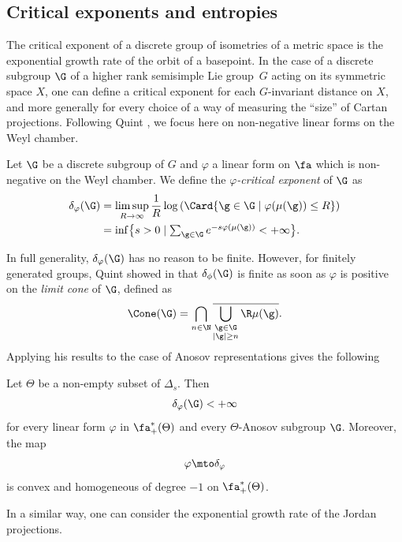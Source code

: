 \subsection{Critical exponents and entropies} \label{subsec - Critical exponents symmetric space}

The critical exponent of a discrete group of isometries of a metric space is the exponential growth rate of the orbit of a basepoint. In the case of a discrete subgroup $\G$ of a higher rank semisimple Lie group~$G$ acting on its symmetric space $X$, one can define a critical exponent for each $G$\nobreakdash-invariant distance on $X$, and more generally for every choice of a way of measuring the ``size'' of Cartan projections. Following Quint \cite{quint2002divergence}, we focus here on non-negative linear forms on the Weyl chamber.

\begin{defi}
Let $\G$ be a discrete subgroup of $G$ and $\varphi$ a linear form on $\fa$ which is non-negative on the Weyl chamber. We define the \emph{$\varphi$-critical exponent} of $\G$ as
\begin{align*}
\delta_\varphi(\G) &= \limsup_{R\to \infty} \frac{1}{R} \log \left(\Card \{ \g \in \G \mid \varphi(\mu(\g)) \leq R\} \right)\\
&\textstyle= \inf\bigl\{s>0\mid \sum_{\g\in \G} e^{-s\varphi(\mu(\g))} < +\infty\bigr\}.
\end{align*}
\end{defi}

In full generality, $\delta_\varphi(\G)$ has no reason to be finite. However, for finitely generated groups, Quint showed in \cite{quint2002divergence} that $\delta_\phi(\G)$ is finite as soon as $\varphi$ is positive on the \emph{limit cone} of $\G$, defined as
\[\Cone(\G) = \bigcap_{n\in \N}\overline{\bigcup_{\substack{\g \in \G\\ \vert \g \vert \geq n}} \R \mu(\g)}.\]
Applying his results to the case of Anosov representations gives the following
\begin{prop}
Let $\Theta$ be a non-empty subset of $\Delta_s$. Then
\[\delta_\varphi(\G) < +\infty\]
for every linear form $\varphi$ in $\fa_+^*(\Theta)$ and every $\Theta$-Anosov subgroup $\G$. Moreover, the map
\[\varphi \mto \delta_\varphi\]
is convex and homogeneous of degree $-1$ on $\fa_+^*(\Theta)$.
\end{prop}

In a similar way, one can consider the exponential growth rate of the Jordan projections.

